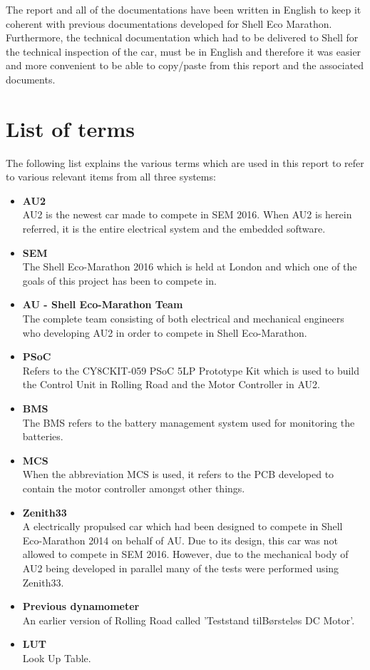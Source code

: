 The report and all of the documentations have been written in English to keep it coherent with previous documentations developed for Shell Eco Marathon. Furthermore, the technical documentation which had to be delivered to Shell for the technical inspection of the car, must be in English and therefore it was easier and more convenient to be able to copy/paste from this report and the associated documents.

\section{List of terms}
The following list explains the various terms which are used in this report to refer to various relevant items from all three systems:
\begin{itemize}
	\item \textbf{AU2}\\
	AU2 is the newest car made to compete in SEM 2016. When AU2 is herein referred, it is the entire electrical system and the embedded software. 
	\item \textbf{SEM}\\
	The Shell Eco-Marathon 2016 which is held at London and which one of the goals of this project has been to compete in.
	\item \textbf{AU - Shell Eco-Marathon Team}\\
	The complete team consisting of both electrical and mechanical engineers who developing AU2 in order to compete in Shell Eco-Marathon.
	\item \textbf{PSoC}\\
	Refers to the CY8CKIT-059 PSoC 5LP Prototype Kit which is used to build the Control Unit in Rolling Road and the Motor Controller in AU2.
	\item \textbf{BMS}\\
	The BMS refers to the battery management system used for monitoring the batteries. 
	\item \textbf{MCS}\\
	When the abbreviation MCS is used, it refers to the PCB developed to contain the motor controller amongst other things.
	\item \textbf{Zenith33}\\
	A electrically propulsed car which had been designed to compete in Shell Eco-Marathon 2014\cite{BAC_zenith33} on behalf of AU. Due to its design, this car was not allowed to compete in SEM 2016. However, due to the mechanical body of AU2 being developed in parallel many of the tests were performed using Zenith33.
	\item \textbf{Previous dynamometer}\\
	An earlier version of Rolling Road called 'Teststand tilBørsteløs DC Motor'\cite{BAC_rullefelt}. 
	\item \textbf{LUT}\\
	Look Up Table. 
\end{itemize}

